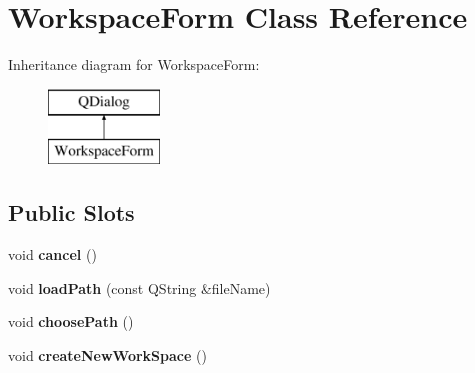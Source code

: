 \hypertarget{class_workspace_form}{\section{Workspace\-Form Class Reference}
\label{class_workspace_form}
}
Inheritance diagram for Workspace\-Form\-:\begin{figure}[H]
\begin{center}
\leavevmode
\includegraphics[height=2.000000cm]{class_workspace_form}
\end{center}
\end{figure}
\subsection*{Public Slots}
\begin{DoxyCompactItemize}
\item 
\hypertarget{class_workspace_form_afb50601608f1e6d3d9d6bc4def5957b7}{void {\bfseries cancel} ()}\label{class_workspace_form_afb50601608f1e6d3d9d6bc4def5957b7}

\item 
\hypertarget{class_workspace_form_ad40eb251cba649451be98a021bac187d}{void {\bfseries load\-Path} (const Q\-String \&file\-Name)}\label{class_workspace_form_ad40eb251cba649451be98a021bac187d}

\item 
\hypertarget{class_workspace_form_a546b82b7017f13f9bff27438a1a864c4}{void {\bfseries choose\-Path} ()}\label{class_workspace_form_a546b82b7017f13f9bff27438a1a864c4}

\item 
\hypertarget{class_workspace_form_a474e0da19529de564cd9c93e8ca1cdf4}{void {\bfseries create\-New\-Work\-Space} ()}\label{class_workspace_form_a474e0da19529de564cd9c93e8ca1cdf4}

\end{DoxyCompactItemize}
